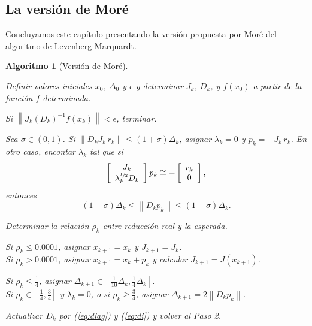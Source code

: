 \documentclass[11pt,a4paper]{book}
\newtheorem{algorithm}[theorem]{Algoritmo}
\theoremstyle{definition}
\theoremstyle{remark}
\newcommand{\norm}[1]{\left\lVert#1\right\rVert}
\begin{document}
\subsection{La versión de Moré}
Concluyamos este capítulo presentando la versión propuesta por Moré del algoritmo de Levenberg-Marquardt.
\begin{algorithm}[Versión de Moré]\label{alg:more}\leavevmode
\begin{steps}
	\item Definir valores iniciales $x_0$, $\Delta_0$ y $\epsilon$ y determinar $J_k$, $D_k$, y $f(x_0)$ a partir de la función $f$ determinada.
	\item Si $\norm{J_k(D_k)^{-1}f(x_k)} < \epsilon$, terminar.
	\item Sea $\sigma \in (0,1)$. Si $\norm{D_kJ_k^{-}r_k} \leq (1+\sigma) \Delta_k$,
	asignar $\lambda_k = 0$ y $p_k = -J_k^{-}r_k$. En otro caso, encontar $\lambda_k$
	tal que si
	\begin{equation}
		\left[
			\begin{array}{c}
				J_k \\
				\lambda_k^{\sfrac{1}{2}}D_k
			\end{array}
		\right]p_k
		\cong
		-\left[
			\begin{array}{c}
				r_k \\
				0
			\end{array}
		\right],
	\end{equation}
	entonces
	\begin{equation}
		(1-\sigma)\Delta_k \leq \norm{D_kp_k} \leq (1+\sigma)\Delta_k.
	\end{equation}
	\item Determinar la relación $\rho_k$ entre reducción real y la esperada.
	\item Si $\rho_k \leq 0.0001$, asignar $x_{k+1} = x_k$ y $J_{k+1} = J_k$. \\
	Si $\rho_k > 0.0001$, asignar $x_{k+1} = x_k + p_k$ y calcular $J_{k+1} = J(x_{k+1})$.
	\item Si $\rho_k \leq \frac{1}{4}$, asignar $\Delta_{k+1} \in \left[
		\frac{1}{10}\Delta_k, \frac{1}{4}\Delta_k \right]$. \\
		Si $\rho_k \in \left[ \frac{1}{4}, \frac{3}{4} \right]$ y $\lambda_k = 0$,
		o si $\rho_k \geq \frac{3}{4}$,
		asignar $\Delta_{k+1} = 2\norm{D_kp_k}$.
	\item Actualizar $D_k$ por (\ref{eq:diag}) y (\ref{eq:di}) y volver al Paso 2.
\end{steps}
\end{algorithm}
\end{document}
